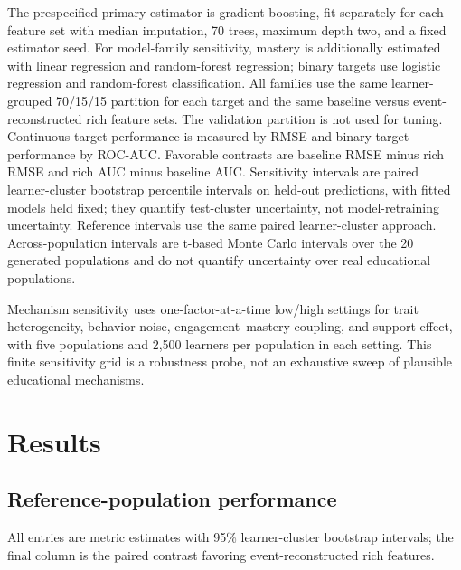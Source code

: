 \documentclass[11pt]{article}
\begin{document}
The prespecified primary estimator is gradient boosting, fit separately for each feature set with median imputation, 70 trees, maximum depth two, and a fixed estimator seed. For model-family sensitivity, mastery is additionally estimated with linear regression and random-forest regression; binary targets use logistic regression and random-forest classification. All families use the same learner-grouped 70/15/15 partition for each target and the same baseline versus event-reconstructed rich feature sets. The validation partition is not used for tuning. Continuous-target performance is measured by RMSE and binary-target performance by ROC-AUC. Favorable contrasts are baseline RMSE minus rich RMSE and rich AUC minus baseline AUC. Sensitivity intervals are paired learner-cluster bootstrap percentile intervals on held-out predictions, with fitted models held fixed; they quantify test-cluster uncertainty, not model-retraining uncertainty. Reference intervals use the same paired learner-cluster approach. Across-population intervals are t-based Monte Carlo intervals over the 20 generated populations and do not quantify uncertainty over real educational populations.

Mechanism sensitivity uses one-factor-at-a-time low/high settings for trait heterogeneity, behavior noise, engagement–mastery coupling, and support effect, with five populations and 2,500 learners per population in each setting. This finite sensitivity grid is a robustness probe, not an exhaustive sweep of plausible educational mechanisms.

\section{Results}

\subsection{Reference-population performance}

All entries are metric estimates with 95\% learner-cluster bootstrap intervals; the final column is the paired contrast favoring event-reconstructed rich features.
\end{document}
